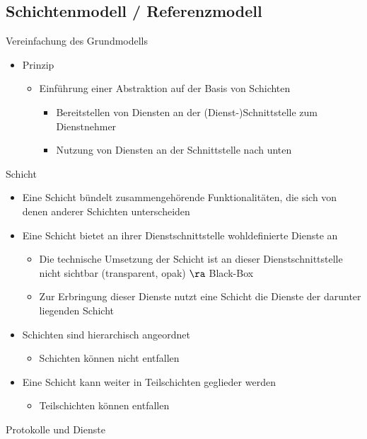   \subsection{Schichtenmodell / Referenzmodell}
    Vereinfachung des Grundmodells
    \begin{itemize}
      \item Prinzip
        \begin{itemize}
          \item Einführung einer Abstraktion auf der Basis von Schichten
            \begin{itemize}
              \item Bereitstellen von Diensten an der (Dienst-)Schnittstelle zum Dienstnehmer
              \item Nutzung von Diensten an der Schnittstelle nach unten
            \end{itemize}
        \end{itemize}
    \end{itemize}
    Schicht
    \begin{itemize}
      \item Eine Schicht bündelt zusammengehörende Funktionalitäten, die sich von denen anderer
        Schichten unterscheiden
      \item Eine Schicht bietet an ihrer Dienstschnittstelle wohldefinierte Dienste an     
        \begin{itemize}
          \item Die technische Umsetzung der Schicht ist an dieser Dienstschnittstelle nicht sichtbar
            (transparent, opak) $\ra$ Black-Box
          \item Zur Erbringung dieser Dienste nutzt eine Schicht die Dienste der darunter liegenden
            Schicht
        \end{itemize}
      \item Schichten sind hierarchisch angeordnet
        \begin{itemize}
          \item Schichten können nicht entfallen
        \end{itemize}
      \item Eine Schicht kann weiter in Teilschichten geglieder werden
        \begin{itemize}
          \item Teilschichten können entfallen
        \end{itemize}
    \end{itemize}
    Protokolle und Dienste
